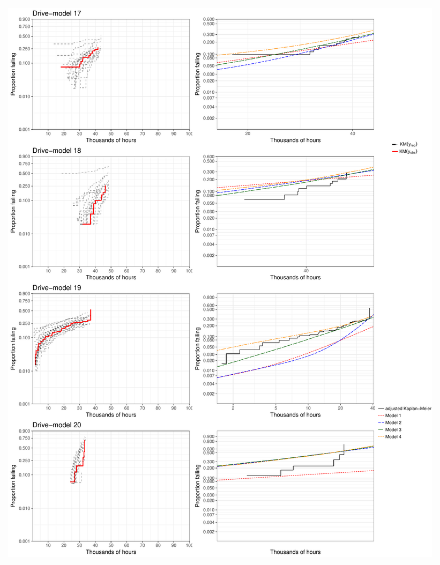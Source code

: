 \documentclass[12pt]{article}
\begin{document}
\begin{figure}[H]
\includegraphics[width=\textwidth]{ppcheck-v3-5.pdf}
\end{figure}
\end{document}
